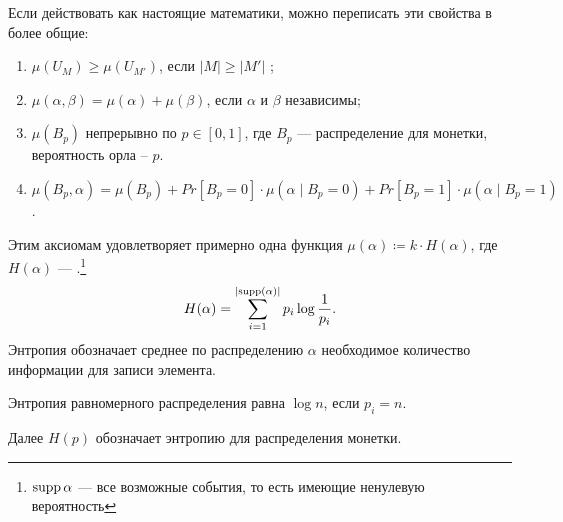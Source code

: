 Если действовать как настоящие математики, можно переписать эти свойства в более общие:
\begin{enumerate}
	\item $ \mu(U_{M}) \ge \mu(U_{M'})$, если $ \lvert M \rvert \ge \lvert M' \rvert $ ;
	\item $\mu ( \alpha,  \beta ) = \mu ( \alpha ) + \mu ( \beta )$, если  $  \alpha $ и $  \beta $ независимы;
	\item $ \mu(B_p)$ непрерывно по $ p \in [0, 1]$, где $ B_p  $ --- распределение для монетки, вероятность орла -- $ p$. 
	\item $ \mu(B_p, \alpha ) = \mu(B_p) + Pr[B_p = 0]\cdot \mu( \alpha \mid B_p = 0) + Pr[B_p = 1]\cdot \mu( \alpha \mid B_p = 1)$.
\end{enumerate} 

\begin{defn}[Энтропия]
	Этим аксиомам удовлетворяет примерно одна функция $  \mu( \alpha ) \coloneqq k \cdot H( \alpha )$, где $ H( \alpha )$ --- .\footnote{$ \operatorname{supp} \alpha $ --- все возможные события, то есть имеющие ненулевую вероятность}
\[
	H( \alpha ) = \sum_{i = 1}^{\lvert \operatorname{supp} ( \alpha ) \rvert } p_i \log \frac{1}{p_i}
.\] 
Энтропия обозначает среднее по распределению $  \alpha $ необходимое количество информации для записи элемента.
\end{defn}
\begin{note}
    Энтропия равномерного распределения равна $ \log n$, если $ p_i = n$.
\end{note}
\begin{note}
	Далее $ H(p) $ обозначает энтропию для распределения монетки.
\end{note}

